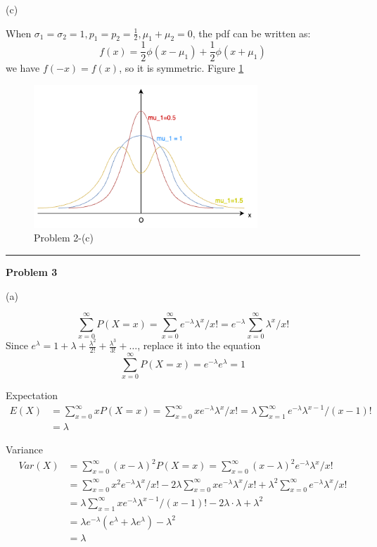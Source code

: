 \documentclass[letterpaper, 11pt]{article}
\newcommand{\1}{\mathds{1}}	%
\theoremstyle{definition}
\begin{document}
(c)

When $\sigma_1 = \sigma_2 = 1, p_1 = p_2 = \frac{1}{2}, \mu_1 + \mu_2 = 0$, the pdf can be written as:
\[
    f(x) = \frac{1}{2}  \phi ({x - \mu_1}) + \frac{1}{2} \phi ({x + \mu_1})
\]
we have $f(-x) = f(x)$, so it is symmetric. Figure \ref{fig:p2-c}

\begin{figure}[H] %
    \centering
    \includegraphics[width=0.75\textwidth]{images/stats-a1-p2-c.drawio.png}
    \caption{Problem 2-(c)}
    \label{fig:p2-c}
\end{figure}

\bigskip
\hrule
\bigskip


\textbf{Problem 3}

(a)

\[
    \sum_{x=0}^{\infty } P(X=x) = \sum_{x=0}^{\infty } e^{-\lambda}\lambda^{x}/x! = e^{-\lambda} \sum_{x=0}^{\infty }\lambda^x/x!
\]
Since $e^\lambda = 1 + \lambda + \frac{\lambda ^{2}}{2!} + \frac{\lambda ^{3}}{3!} + \dots$, replace it into the equation \[
    \sum_{x=0}^{\infty } P(X=x) =  e^{-\lambda}  e^{\lambda} = 1
\]

Expectation \begin{align*}
    E(X) & = \sum_{x=0}^{\infty } xP(X=x) = \sum_{x=0}^{\infty } x e^{-\lambda}\lambda^{x}/x! = \lambda \sum_{x=1}^{\infty } e^{-\lambda}\lambda^{x -1}/(x-1)! \\
         & = \lambda
\end{align*}

Variance \begin{align*}
    Var(X) & = \sum_{x=0}^{\infty } (x-\lambda)^{2} P(X=x) = \sum_{x=0}^{\infty } (x-\lambda)^{2}  e^{-\lambda}\lambda^{x}/x! \\
           & = \sum_{x=0}^{\infty } x ^{2} e^{-\lambda}\lambda^{x}/x!
    -2 \lambda\sum_{x=0}^{\infty } x  e^{-\lambda}\lambda^{x}/x!
    + \lambda ^{2} \sum_{x=0}^{\infty } e^{-\lambda}\lambda^{x}/x!                                                            \\
           & = \lambda \sum_{x=1}^{\infty } x e^{-\lambda}\lambda^{x-1}/(x-1)! -2\lambda \cdot \lambda + \lambda ^{2}         \\
           & = \lambda e^{-\lambda} (e^{\lambda} + \lambda e^{\lambda}) - \lambda ^{2}                                        \\
           & = \lambda
\end{align*}
\end{document}
